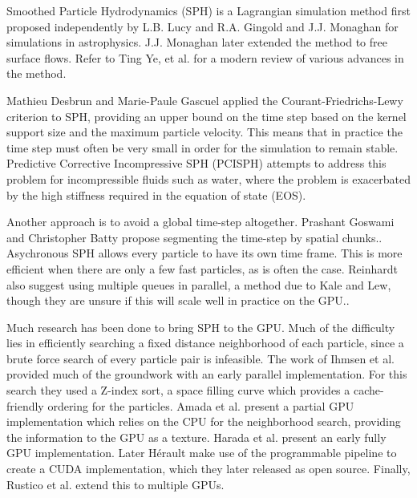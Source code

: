 \documentclass[format=acmtog,natbib=false]{acmart}
\begin{document}

Smoothed Particle Hydrodynamics (SPH) is a Lagrangian simulation method first proposed independently by L.B. Lucy\cite{lucy1977numerical} and R.A. Gingold and J.J. Monaghan\cite{gingold1977smoothed} for simulations in astrophysics. J.J. Monaghan later extended the method to free surface flows\cite{monaghan1994simulating}. Refer to Ting Ye, et al. for a modern review of various advances in the method.


Mathieu Desbrun and Marie-Paule Gascuel applied the Courant-Friedrichs-Lewy criterion to SPH, providing an upper bound on the time step based on the kernel support size and the maximum particle velocity\cite{desbrun1996smoothed}. This means that in practice the time step must often be very small in order for the simulation to remain stable. Predictive Corrective Incompressive SPH (PCISPH) attempts to address this problem for incompressible fluids such as water, where the problem is exacerbated by the high stiffness required in the equation of state (EOS)\cite{solenthaler2009predictive}.

Another approach is to avoid a global time-step altogether. Prashant Goswami and Christopher Batty propose segmenting the time-step by spatial chunks.\cite{goswami2014regional}. Asychronous SPH allows every particle to have its own time frame\cite{reinhardt2017fully}\cite{ban2018adaptively}\cite{desbrun1996smoothed}. This is more efficient when there are only a few fast particles, as is often the case. Reinhardt also suggest using multiple queues in parallel, a method due to Kale and Lew, though they are unsure if this will scale well in practice on the GPU.\cite{reinhardt2017fully}\cite{kale2007parallel}.


Much research has been done to bring SPH to the GPU. Much of the difficulty lies in efficiently searching a fixed distance neighborhood of each particle, since a brute force search of every particle pair is infeasible. The work of Ihmsen et al. provided much of the groundwork with an early parallel implementation.\cite{ihmsen2011parallel} For this search they used a Z-index sort, a space filling curve which provides a cache-friendly ordering for the particles. Amada et al. present a partial GPU implementation which relies on the CPU for the neighborhood search, providing the information to the GPU as a texture.\cite{amada2004particle} Harada et al. present an early fully GPU implementation\cite{harada2007smoothed}. Later H{\'e}rault make use of the programmable pipeline to create a CUDA implementation\cite{herault2010sph}, which they later released as open source\cite{gpusph}. Finally, Rustico et al. extend this to multiple GPUs.\cite{rustico2012journey}
\end{document}
